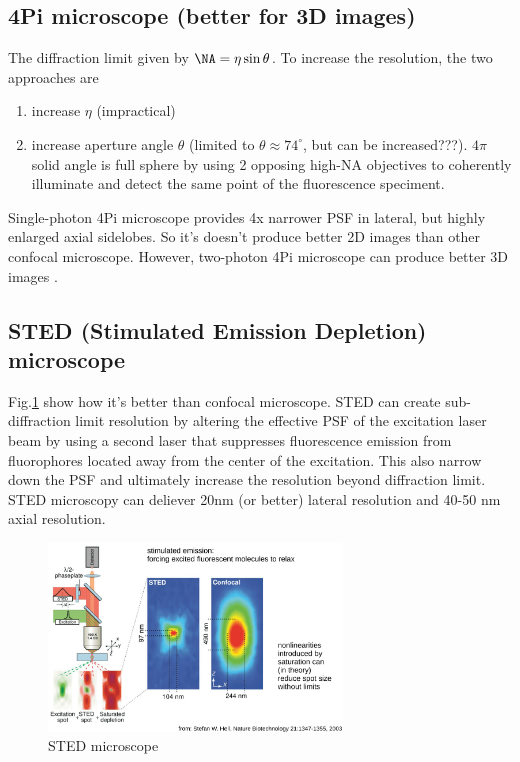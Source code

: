 \subsection{4Pi microscope (better for 3D images)}

The diffraction limit given by $\NA = \eta \sin\theta$. To increase the
resolution, the two approaches are
\begin{enumerate}
  \item increase $\eta$ (impractical)
  \item increase aperture angle $\theta$ (limited to $\theta \approx 74^\circ$,
  but can be increased???). $4\pi$ solid angle is full sphere by using 2
  opposing high-NA objectives to coherently illuminate and detect the same
  point of the fluorescence speciment.
\end{enumerate}
Single-photon 4Pi microscope provides 4x narrower PSF in lateral, but highly
enlarged axial sidelobes. So it's doesn't produce better 2D images than
other confocal microscope. However, two-photon 4Pi microscope can produce better
3D images \citep{blanca2001}.

\subsection{STED (Stimulated Emission Depletion) microscope}
\label{sec:STED}

Fig.\ref{fig:STED_microscope} show how it's better than confocal microscope.
STED can create sub-diffraction limit resolution by altering the effective PSF
of the excitation laser beam by using a second laser that suppresses
fluorescence emission from fluorophores located away from the center of the
excitation. This also narrow down the PSF and ultimately increase the resolution
beyond diffraction limit. STED microscopy can deliever 20nm (or better) lateral
resolution and 40-50 nm axial resolution.

\begin{figure}[hbt]
  \centerline{\includegraphics[height=5cm,
    angle=0]{./images/STED_microscope.eps}}
  \caption{STED microscope}
  \label{fig:STED_microscope}
\end{figure}

